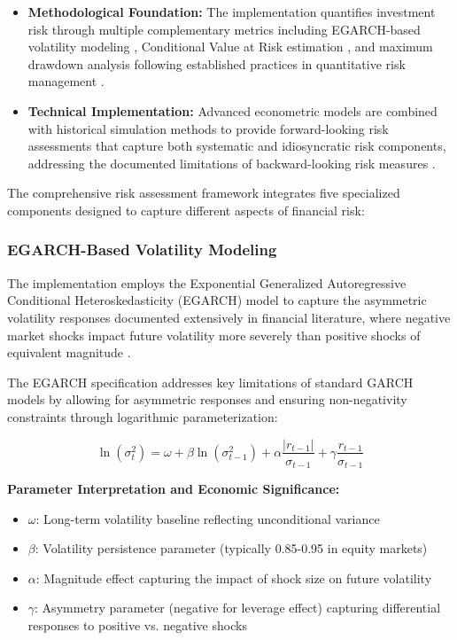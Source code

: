 \documentclass[3p,times,procedia]{elsarticle}
\begin{document}
\begin{itemize}
    \item \textbf{Methodological Foundation:} The implementation quantifies investment risk through multiple complementary metrics including EGARCH-based volatility modeling \cite{Nelson1991}, Conditional Value at Risk estimation \cite{Rockafellar2000}, and maximum drawdown analysis following established practices in quantitative risk management \cite{Jorion2001}.
    \item \textbf{Technical Implementation:} Advanced econometric models are combined with historical simulation methods to provide forward-looking risk assessments that capture both systematic and idiosyncratic risk components, addressing the documented limitations of backward-looking risk measures \cite{Campbell2001}.
\end{itemize}

The comprehensive risk assessment framework integrates five specialized components designed to capture different aspects of financial risk:

\subsubsection{{EGARCH-Based Volatility Modeling}}

The implementation employs the Exponential Generalized Autoregressive Conditional Heteroskedasticity (EGARCH) model \cite{Nelson1991} to capture the asymmetric volatility responses documented extensively in financial literature, where negative market shocks impact future volatility more severely than positive shocks of equivalent magnitude \cite{Black1976}.

The EGARCH specification addresses key limitations of standard GARCH models by allowing for asymmetric responses and ensuring non-negativity constraints through logarithmic parameterization:

\begin{equation}
\ln(\sigma_t^2) = \omega + \beta \ln(\sigma_{t-1}^2) + \alpha \frac{|r_{t-1}|}{\sigma_{t-1}} + \gamma \frac{r_{t-1}}{\sigma_{t-1}}
\end{equation}

\textbf{Parameter Interpretation and Economic Significance:}
\begin{itemize}
    \item $\omega$: Long-term volatility baseline reflecting unconditional variance
    \item $\beta$: Volatility persistence parameter (typically 0.85-0.95 in equity markets) \cite{Bollerslev1986}
    \item $\alpha$: Magnitude effect capturing the impact of shock size on future volatility
    \item $\gamma$: Asymmetry parameter (negative for leverage effect) capturing differential responses to positive vs. negative shocks \cite{Black1976}
\end{itemize}
\end{document}
